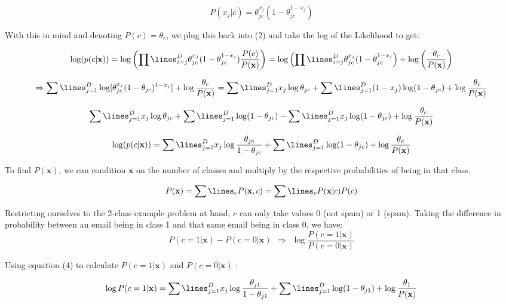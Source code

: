 \begin{equation}
P(x_j | c ) = \theta_{jc}^{x_j} (1 - \theta_{jc}^{1 - x_j})
\end{equation}

With this in mind and denoting $P(c) = \theta_c$, we plug this back into (2) and take the log of the Likelihood to get: 

$$
\log(p(c | \mathbf{x})) = \log \left ( \prod\lines_{i=j}^D \theta_{jc}^{x_j} (1 - \theta_{jc}^{1 - x_j})  \frac{P(c)}{P(\mathbf{x})} \right) = \log \left ( \prod\lines_{i=j}^D \theta_{jc}^{x_j} (1 - \theta_{jc}^{1 - x_j} \right) + \log \left( \frac{\theta_c}{P(\mathbf{x})} \right)
$$

$$
\Rightarrow \sum\lines_{j=1}^D \log[ \theta_{jc}^{x_j} (1 - \theta_{jc})^{1-x_j}] + \log \frac{\theta_c}{P(\mathbf{x})} = \sum\lines_{j=1}^D x_j \log \theta_{jc} + \sum\lines_{j=1}^D (1-x_j) \log(1 - \theta_{jc}) + \log \frac{\theta_c}{P(\mathbf{x})}
$$

$$
\sum\lines_{j=1}^D x_j \log \theta_{jc} + \sum\lines_{j=1}^D \log(1 - \theta_{jc}) - \sum\lines_{j=1}^D x_j \log(1 - \theta_{jc}) + \log \frac{\theta_c}{P(\mathbf{x})}
$$

\begin{equation}
\log(p(c | \mathbf{x})) = \sum\lines_{j=1}^D x_j \log \frac{ \theta_{jc}}{1 - \theta_{jc}} + \sum\lines_{j=1}^D \log(1 - \theta_{jc}) +  \log \frac{\theta_c}{P(\mathbf{x})} 
\end{equation}

To find $P(\mathbf{x})$, we can condition $\mathbf{x}$ on the number of classes and multiply by the respective probabilities of being in that class.  

$$
P(\mathbf{x}) = \sum\lines_c P(\mathbf{x}, c) = \sum\lines_c P(\mathbf{x} | c) P(c)
$$

Restricting ourselves to the 2-class example problem at hand, $c$ can only take values 0 (not spam) or 1 (spam).  Taking the difference in probability between an email being in class 1 and that same email being in class 0, we have: 
\begin{equation}
P( c = 1 | \mathbf{x}) - P( c = 0 | \mathbf{x}) ~~ \Rightarrow ~~ 
\log \frac{  P( c = 1 | \mathbf{x})}{P( c = 0 | \mathbf{x})}
\end{equation}

Using equation (4) to calculate $P(c = 1 | \mathbf{x}) $ and $P(c = 0 | \mathbf{x}) $ :

\begin{equation}
\log P(c = 1 | \mathbf{x}) = \sum\lines_{j=1}^D x_j \log \frac{ \theta_{j1}}{1 - \theta_{j1}} + \sum\lines_{j=1}^D \log(1 - \theta_{j1}) +  \log \frac{\theta_1}{P(\mathbf{x})} 
\end{equation}

